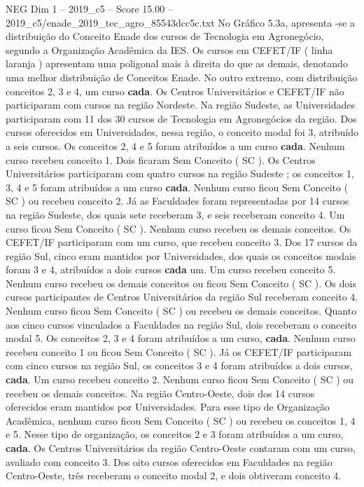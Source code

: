 \begin{textsample}{NEG Dim 1 – 2019\_c5 – Score 15.00 – 2019\_c5/enade\_2019\_tec\_agro\_85543dcc5c.txt}
No Gráfico 5.3a, apresenta -se a distribuição do Conceito Enade dos cursos de Tecnologia em Agronegócio, segundo a Organização Acadêmica da IES.
Os cursos em CEFET/IF ( linha laranja ) apresentam uma poligonal mais à direita do que as demais, denotando uma melhor distribuição de Conceitos Enade.
No outro extremo, com distribuição conceitos 2, 3 e 4, um curso \textbf{cada}.
Os Centros Universitários e CEFET/IF não participaram com cursos na região Nordeste.
Na região Sudeste, as Universidades participaram com 11 dos 30 cursos de Tecnologia em Agronegócios da região.
Dos cursos oferecidos em Universidades, nessa região, o conceito modal foi 3, atribuído a seis cursos.
Os conceitos 2, 4 e 5 foram atribuídos a um curso \textbf{cada}.
Nenhum curso recebeu conceito 1.
Dois ficaram Sem Conceito ( SC ).
Os Centros Universitários participaram com quatro cursos na região Sudeste ; os conceitos 1, 3, 4 e 5 foram atribuídos a um curso \textbf{cada}.
Nenhum curso ficou Sem Conceito ( SC ) ou recebeu conceito 2.
Já as Faculdades foram representadas por 14 cursos na região Sudeste, dos quais sete receberam 3, e seis receberam conceito 4.
Um curso ficou Sem Conceito ( SC ).
Nenhum curso recebeu os demais conceitos.
Os CEFET/IF participaram com um curso, que recebeu conceito 3.
Dos 17 cursos da região Sul, cinco eram mantidos por Universidades, dos quais os conceitos modais foram 3 e 4, atribuídos a dois cursos \textbf{cada} um.
Um curso recebeu conceito 5.
Nenhum curso recebeu os demais conceitos ou ficou Sem Conceito ( SC ).
Os dois cursos participantes de Centros Universitários da região Sul receberam conceito 4.
Nenhum curso ficou Sem Conceito ( SC ) ou recebeu os demais conceitos.
Quanto aos cinco cursos vinculados a Faculdades na região Sul, dois receberam o conceito modal 5.
Os conceitos 2, 3 e 4 foram atribuídos a um curso, \textbf{cada}.
Nenhum curso recebeu conceito 1 ou ficou Sem Conceito ( SC ).
Já os CEFET/IF participaram com cinco cursos na região Sul, os conceitos 3 e 4 foram atribuídos a dois cursos, \textbf{cada}.
Um curso recebeu conceito 2.
Nenhum curso ficou Sem Conceito ( SC ) ou recebeu os demais conceitos.
Na região Centro-Oeste, dois dos 14 cursos oferecidos eram mantidos por Universidades.
Para esse tipo de Organização Acadêmica, nenhum curso ficou Sem Conceito ( SC ) ou recebeu os conceitos 1, 4 e 5.
Nesse tipo de organização, os conceitos 2 e 3 foram atribuídos a um curso, \textbf{cada}.
Os Centros Universitários da região Centro-Oeste contaram com um curso, avaliado com conceito 3.
Dos oito cursos oferecidos em Faculdades na região Centro-Oeste, três receberam o conceito modal 2, e dois obtiveram conceito 4.

\end{textsample}
